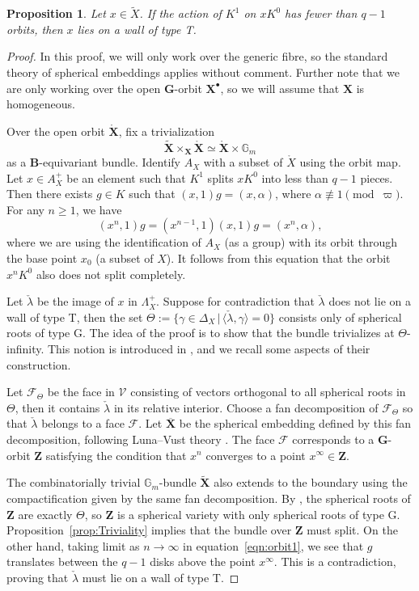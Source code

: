 \documentclass{amsart}
\newtheorem{prop}[theorem]{Proposition}
\theoremstyle{definition}
\theoremstyle{remark}
\newcommand{\1}{\mathbf{1}}
\newcommand{\bra}{\langle}
\newcommand{\G}{\mathbf{G}}
\newcommand{\ket}{\rangle}
\newcommand{\mb}[1]{\mathbf{#1}}
\newcommand{\sh}[1]{\mathcal{#1}}
\theoremstyle{definition}
\renewcommand{\G}{\mathbb{G}}
\newcommand{\tX}{{\widetilde{X}}}
\begin{document}
\begin{prop}\label{prop:Volume}
  Let $x\in\tX$. If the action of $K^1$ on $xK^0$ has fewer than $q-1$ orbits, then $x$ lies on a wall of type T.
\end{prop}
\begin{proof}
    In this proof, we will only work over the generic fibre, so the standard theory of spherical embeddings applies without comment. Further note that we are only working over the open $\mb{G}$-orbit $\mb{X}^\bullet$, so we will assume that $\mb{X}$ is homogeneous.
    
    Over the open orbit $\mathring{\mb{X}}$, fix a trivialization
    \[
        \widetilde{\mb{X}}\times_{\mb{X}}\mathring{\mb{X}}\simeq\mathring{\mb{X}}\times\G_m
    \]
    as a $\mb{B}$-equivariant bundle. Identify $A_X$ with a subset of $\mathring{X}$ using the orbit map. Let $x\in A_X^+$ be an element such that $K^1$ splits $xK^0$ into less than $q-1$ pieces. Then there exists $g\in K$ such that $(x,1)g=(x,\alpha)$, where $\alpha\not\equiv 1\pmod{\varpi}$. For any $n\geq 1$, we have
    \begin{equation}\label{eqn:orbit1}
        (x^n,1)g=(x^{n-1},1)(x,1)g=(x^n,\alpha),
    \end{equation}
    where we are using the identification of $A_X$ (as a group) with its orbit through the base point $x_0$ (a subset of $X$). It follows from this equation that the orbit $x^n K^0$ also does not split completely.

    Let $\check{\lambda}$ be the image of $x$ in $\Lambda_X^+$. Suppose for contradiction that $\check{\lambda}$ does not lie on a wall of type T, then the set $\Theta:=\{\gamma\in\Delta_X\,|\,\bra\check{\lambda},\gamma\ket=0\}$ consists only of spherical roots of type G. The idea of the proof is to show that the bundle trivializes at $\Theta$-infinity. This notion is introduced in \cite[\S 2.3]{SVSpherical}, and we recall some aspects of their construction.
    
    Let $\sh{F}_\Theta$ be the face in $\sh{V}$ consisting of vectors orthogonal to all spherical roots in $\Theta$, then it contains $\check{\lambda}$ in its relative interior. Choose a fan decomposition of $\sh{F}_\Theta$ so that $\check{\lambda}$ belongs to a face $\sh{F}$. Let $\overline{\mb{X}}$ be the spherical embedding defined by this fan decomposition, following Luna--Vust theory \cite[Theorem 3.3]{Knop91}. The face $\sh{F}$ corresponds to a $\mb{G}$-orbit $\mb{Z}$ satisfying the condition that $x^n$ converges to a point $x^\infty\in\mb{Z}$.
    
    The combinatorially trivial $\G_m$-bundle $\widetilde{\mb{X}}$ also extends to the boundary using the compactification given by the same fan decomposition. By \cite[Proposition 2.3.8(3)]{SVSpherical}, the spherical roots of $\mb{Z}$ are exactly $\Theta$, so $\mb{Z}$ is a spherical variety with only spherical roots of type G. Proposition~\ref{prop:Triviality} implies that the bundle over $\mb{Z}$ must split. On the other hand, taking limit as $n\to\infty$ in equation~\eqref{eqn:orbit1}, we see that $g$ translates between the $q-1$ disks above the point $x^\infty$. This is a contradiction, proving that $\check{\lambda}$ must lie on a wall of type T.
\end{proof}
\end{document}
